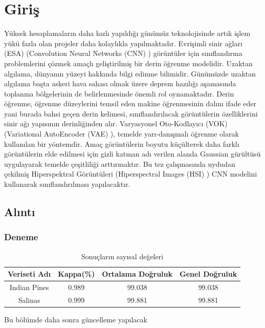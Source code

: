 \chapter{Giriş}
\thispagestyle{empty}

Yüksek hesaplamaların daha hızlı yapıldığı günümüz teknolojisinde artık işlem yükü fazla olan projeler daha kolaylıkla yapılmaktadır. Evrişimli sinir ağları (ESA) (Convolution Neural Networks (CNN) ) görüntüler için sınıflandırma problemlerini çözmek amaçlı geliştirilmiş bir derin öğrenme modelidir. Uzaktan algılama, dünyanın yüzeyi hakkında bilgi edinme bilimidir. Günümüzde uzaktan algılama başta askeri hava sahası olmak üzere deprem hazılığı aşamasında toplanma bölgelerinin de belirlenmesinde önemli rol oynamaktadır. Derin öğrenme, öğrenme düzeylerini temsil eden makine öğrenmesinin dalını ifade eder yani burada bahsi geçen derin kelimesi, sınıflandırılacak görüntülerin özelliklerini sinir ağı yapısının derinliğinden alır. Varyasyonel Oto-Kodlayıcı (VOK) (Variational AutoEncoder (VAE) ), temelde yarı-danışmalı öğrenme olarak kullanılan bir yöntemdir. Amaç görüntülerin boyutu küçülterek daha farklı görüntülerin elde edilmesi için gizli katman adı verilen alanda Gaussian gürültüsü uygulayarak temelde çeşitliliği arttırmaktır. Bu tez çalışmasında uydudan çekilmiş Hiperspektral Görüntüleri (Hiperspectral Images (HSI) ) CNN modelini kullanarak sınıflandırılması yapılacaktır.
\section{Alıntı}

\subsection{Deneme}

\begin{table}[!ht]
\centering
    \begin{threeparttable} %
    \caption{Sonuçların sayısal değeleri}
        \begin{tabular}{|c|c|c|c|}
        \hline
        \textbf{Veriseti Adı} & \textbf{Kappa(\%)} & \textbf{Ortalama Doğruluk} & \textbf{Genel Doğruluk} \\ \hline
        Indian Pines & 0.989    & 99.038           & 99.038         \\ \hline
        Salinas & 0.999    & 99.881          & 99.881         \\ \hline
        \end{tabular}
    \end{threeparttable} %
\end{table}
Bu bölümde daha sonra güncelleme yapılacak

